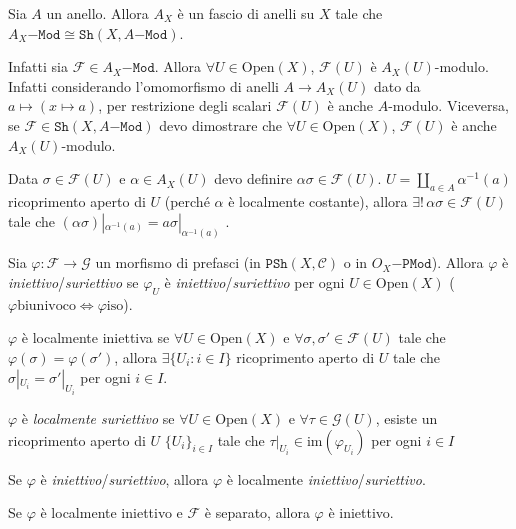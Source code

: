 \begin{example}{}
    Sia \(A\) un anello. Allora \(A_X\) è un fascio di anelli su \(X\) tale che
    \(A_X\mathtt{-Mod}\cong \mathtt{Sh}{(X, A\mathtt{-Mod})}\).

    Infatti sia \(\mathcal{F} \in  A_X\mathtt{-Mod}\). Allora \(\forall U \in
    \mathrm{Open}{(X)}\), \(\mathcal{F}{(U)}\) è \(A_X{(U)}\)-modulo. Infatti
    considerando l'omomorfismo di anelli \(A \to A_X{(U)}\) dato da \(a \mapsto
    {(x \mapsto a)}\), per restrizione degli scalari \(\mathcal{F}{(U)}\) è
    anche \(A\)-modulo. Viceversa, se \(\mathcal{F} \in \mathtt{Sh}{(X,
    A\mathtt{-Mod})}\) devo dimostrare che \(\forall U \in
    \mathrm{Open}{(X)}\), \(\mathcal{F}{(U)}\) è anche \(A_X{(U)}\)-modulo.

    Data \(\sigma \in \mathcal{F}{(U)}\) e \(\alpha \in  A_X{(U)}\) devo
    definire \(\alpha \sigma \in  \mathcal{F}{(U)}\). \(U = \coprod_{a \in A}
    \alpha ^{-1}{(a)}\) ricoprimento aperto di \(U\) (perché \(\alpha\) è
    localmente costante), allora \(\exists ! \, \alpha \sigma \in
    \mathcal{F}{(U)}\) tale che \({(\alpha \sigma)}|_{\alpha^{-1}{(a)}} = a
    \sigma|_{\alpha^{-1}{(a)}}  \) .
\end{example}

\begin{definition}{}
    Sia \(\varphi : \mathcal{F}\to \mathcal{G}\) un morfismo di prefasci (in
    \(\mathtt{PSh}{(X, \mathcal{C})}\) o in \(O_X\mathtt{-PMod}\)). Allora
    \(\varphi \) è \emph{iniettivo}/\emph{suriettivo} se \(\varphi _U\) è
    \emph{iniettivo}/\emph{suriettivo} per ogni \(U \in \mathrm{Open}{(X)}\)
    (\(\varphi \text{biunivoco} \iff \varphi \text{iso}\)).

    \(\varphi \) è localmente iniettiva se \(\forall U \in  \mathrm{Open}{(X)}\)
    e \(\forall  \sigma, \sigma' \in  \mathcal{F}{(U)}\) tale che \(\varphi
    {(\sigma)} = \varphi {(\sigma')}\), allora \(\exists  \{U_{i} : i \in I\} \)
    ricoprimento aperto di \(U\) tale che \(\sigma|_{U_{i}} = \sigma'|_{U_{i}}
    \) per ogni \(i \in I\).

    \(\varphi \) è \emph{localmente suriettivo} se \(\forall U \in
    \mathrm{Open}{(X)}\) e \(\forall \tau \in \mathcal{G}{(U)}\), esiste un
    ricoprimento aperto di \(U\) \(\{U_{i}\}_{i \in I}  \) tale che
    \(\tau|_{U_{i}} \in \mathrm{im}{(\varphi _{U_{i}} )}\) per ogni \(i \in I\) 
\end{definition}

\begin{remark}{}
    Se \(\varphi \) è \emph{iniettivo}/\emph{suriettivo}, allora \(\varphi \) è
    localmente \emph{iniettivo}/\emph{suriettivo}.

    Se \(\varphi \) è localmente iniettivo e \(\mathcal{F}\) è separato, allora
    \(\varphi \) è iniettivo.

\end{remark}

